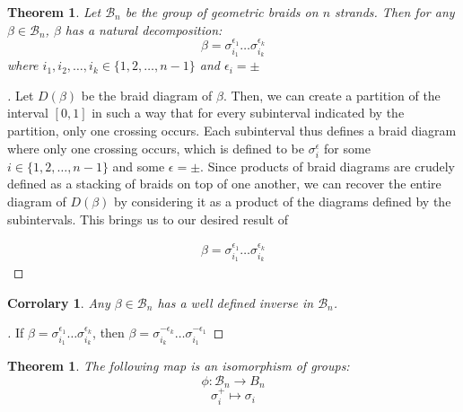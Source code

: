 \documentclass[10pt]{ucthesis}
\newtheorem{theorem}[definition]{Theorem}
\newtheorem{corrolary}[definition]{Corrolary}
\begin{document}
\begin{theorem}
	Let $\mathcal{B}_n$ be the group of geometric braids on $n$ strands. Then for any $\beta\in\mathcal{B}_n$, $\beta$ has a natural decomposition:
$$\beta = \sigma^{\epsilon_1}_{i_1}\hdots\sigma^{\epsilon_k}_{i_k}$$ 
where $i_1,i_2,\hdots,i_k\in\{1,2,\hdots,n-1\}$ and $\epsilon_i = \pm$
\end{theorem}

\noindent \begin{proof}[\cite{Kassel}] Let $D(\beta)$ be the braid diagram of $\beta$. Then, we can create a partition of the interval $[0,1]$ in such a way that for every subinterval indicated by the partition, only one crossing occurs. Each subinterval thus defines a braid diagram where only one crossing occurs, which is defined to be $\sigma_i^\epsilon$ for some $i\in\{1,2,\hdots,n-1\}$ and some $\epsilon = \pm$. Since products of braid diagrams are crudely defined as a stacking of braids on top of one another, we can recover the entire diagram of $D(\beta)$ by considering it as a product of the diagrams defined by the subintervals. This brings us to our desired result of 

\begin{equation}
\begin{aligned}
\beta = \sigma^{\epsilon_1}_{i_1}\hdots\sigma^{\epsilon_k}_{i_k}  
\end{aligned}
\end{equation}
\end{proof}

\begin{corrolary}
	Any $\beta\in\mathcal{B}_n$ has a well defined inverse in $\mathcal{B}_n$.
\end{corrolary}

\noindent\begin{proof}[\cite{Kassel}] If $\beta = \sigma^{\epsilon_1}_{i_1}\hdots\sigma^{\epsilon_k}_{i_k}$, then $\beta = \sigma^{-\epsilon_k}_{i_k}\hdots\sigma^{-\epsilon_1}_{i_1}$ \end{proof} 

\begin{theorem}
	The following map is an isomorphism of groups:
$$\phi:\mathcal{B}_n\rightarrow B_n$$
$$\sigma_i^+ \mapsto \sigma_i$$
\end{theorem}
\end{document}
